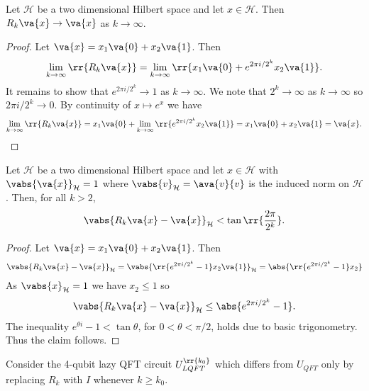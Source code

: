 \documentclass{article}
\begin{document}
\begin{claim*}[b]
  Let $\mathcal H$ be a two dimensional Hilbert space and let $x\in\mathcal H$.
  Then $R_k\va{x}\to\va{x}$ as $k\to\infty$.
  \begin{proof}
    Let $\va{x}=x_1\va{0}+x_2\va{1}$. Then
    \begin{align*}
      \lim_{k\to\infty} \rr{R_k\va{x}}
      = \lim_{k\to\infty} \rr{x_1\va{0} + e^{2\pi i/2^k}x_2\va{1}}.
    \end{align*}
    It remains to show that $e^{2\pi i / 2^k} \to 1$ as $k\to\infty$. We note that
    $2^k\to\infty$ as $k\to\infty$ so $2\pi i / 2^k\to 0$. By continuity of
    $x\mapsto e^x$ we have
    \begin{align*}
      \lim_{k\to\infty} \rr{R_k\va{x}} = x_1\va{0} + \lim_{k\to\infty} \rr{e^{2\pi i/2^k} x_2\va{1}} = x_1\va{0}+x_2\va{1} = \va{x}.
    \end{align*}
  \end{proof}
\end{claim*}

\begin{claim*}[b']
  Let $\mathcal H$ be a two dimensional Hilbert space and let $x\in\mathcal H$
  with $\vabs{\va{x}}_{\mathcal H}=1$
  where $\vabs{v}_{\mathcal H}=\ava{v}{v}$ is the induced norm on $\mathcal H$.
  Then, for all $k>2$,
  \begin{align*}
    \vabs{R_k \va{x}-\va{x}}_{\mathcal H} < \tan\rr{\frac{2\pi}{2^k}}.
  \end{align*}
  \begin{proof}
    Let $\va{x}=x_1\va{0}+x_2\va{1}$. Then
    \begin{align*}
      \vabs{R_k\va{x}-\va{x}}_{\mathcal H}
      = \vabs{\rr{e^{2\pi i / 2^k}-1}x_2\va{1}}_{\mathcal H}
      = \abs{\rr{e^{2\pi i / 2^k}-1}x_2}
    \end{align*}
    As $\vabs{x}_{\mathcal H}=1$ we have $x_2\leq 1$ so
    \begin{align*}
      \vabs{R_k\va{x}-\va{x}}_{\mathcal H}
      \leq \abs{e^{2\pi i / 2^k}-1}.
    \end{align*}
    The inequality $e^{\theta i}-1<\tan\theta$, for $0<\theta < \pi/2$, holds due to
    basic trigonometry. Thus the claim follows.
  \end{proof}
\end{claim*}

Consider the 4-qubit lazy QFT circuit $U_{LQFT}^{\rr{k_0}}$ which differs from $U_{QFT}$
only by replacing $R_k$ with $I$ whenever $k\geq k_0$.
\end{document}
